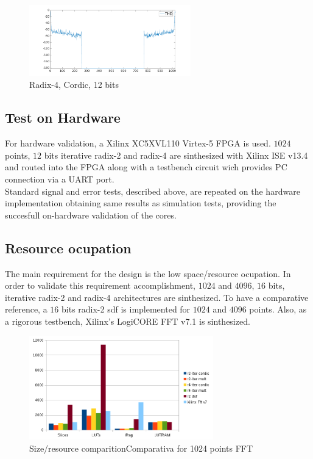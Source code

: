 \documentclass[conference]{IEEEtran}
\begin{document}
\begin{figure}[Htb!]
        \centering
        \includegraphics[width=7cm]{./figures/thd_r4_1024_12_cor.png}
        \caption{Radix-4, Cordic, 12 bits}
        \label{fig:r4_thd_1024_cor}
\end{figure}

\subsection{Test on Hardware}

For hardware validation, a Xilinx XC5XVL110 Virtex-5 FPGA is used. $1024$ points, $12$ bits iterative radix-2 and radix-4 are 
sinthesized with Xilinx ISE v13.4 and routed into the FPGA along with a testbench circuit wich provides PC connection via a UART port.\\
Standard signal and error tests, described above, are repeated on the hardware implementation obtaining same results as simulation tests, 
providing the succesfull on-hardware validation of the cores.

\subsection{Resource ocupation}

The main requirement for the design is the low space/resource ocupation. In order to validate this requirement accomplishment, $1024$ and $4096$, $16$ bits, iterative radix-2 and radix-4 architectures are 
sinthesized. To have a comparative reference, a $16$ bits radix-2 sdf is implemented for $1024$ and $4096$ points.
Also, as a rigorous testbench, Xilinx's LogiCORE FFT v7.1 \cite{fftXilinx} is sinthesized.

\begin{figure}[htb!]
        \centering
        \includegraphics[width=8cm]{./figures/sizecomp1024.png}
        \caption{Size/resource comparitionComparativa for 1024 points FFT}
        \label{fig:sizecomp1024}
\end{figure}
\end{document}
